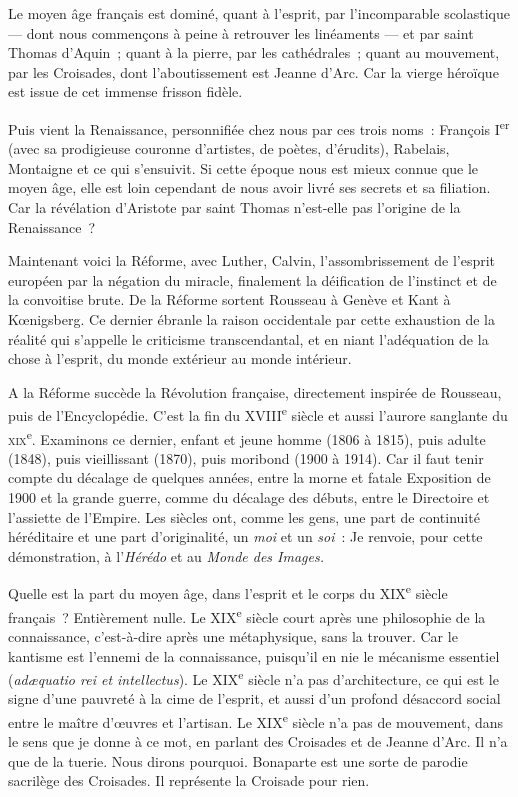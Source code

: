 \documentclass[french,twoside]{book} %
\begin{document}
Le moyen âge français est dominé, quant à l’esprit, par l’incomparable scolastique — dont nous commençons à peine à retrouver les linéaments — et par saint Thomas d’Aquin ; quant à la pierre, par les cathédrales ; quant au mouvement, par les Croisades, dont l’aboutissement est Jeanne d’Arc. Car la vierge héroïque est issue de cet immense frisson fidèle.\par
Puis vient la Renaissance, personnifiée chez nous par ces trois noms : François I\textsuperscript{er} (avec sa prodigieuse couronne d’artistes, de poètes, d’érudits), Rabelais, Montaigne et ce qui s’ensuivit. Si cette époque nous est mieux connue que le moyen âge, elle est loin cependant de nous avoir livré ses secrets et sa filiation. Car la révélation d’Aristote par saint Thomas n’est-elle pas l’origine de la Renaissance ?\par
Maintenant voici la Réforme, avec Luther, Calvin, l’assombrissement de l’esprit européen par la négation du miracle, finalement la déification de l’instinct et de la convoitise brute. De la Réforme sortent Rousseau à Genève et Kant à Kœnigsberg. Ce dernier ébranle la raison occidentale par cette exhaustion de la réalité qui s’appelle le criticisme transcendantal, et en niant l’adéquation de la chose à l’esprit, du monde extérieur au monde intérieur.\par
A la Réforme succède la Révolution française, directement inspirée de Rousseau, puis de l’Encyclopédie. C’est la fin du XVIII\textsuperscript{e} siècle et aussi l’aurore sanglante du \textsc{xix}\textsuperscript{e}. Examinons ce dernier, enfant et jeune homme (1806 à 1815), puis adulte (1848), puis vieillissant (1870), puis moribond (1900 à 1914). Car il faut tenir compte du décalage de quelques années, entre la morne et fatale Exposition de 1900 et la grande guerre, comme du décalage des débuts, entre le Directoire et l’assiette de l’Empire. Les siècles ont, comme les gens, une part de continuité héréditaire et une part d’originalité, un {\itshape moi} et un {\itshape soi} : Je renvoie, pour cette démonstration, à l’{\itshape Hérédo} et au {\itshape Monde des Images.}\par
Quelle est la part du moyen âge, dans l’esprit et le corps du XIX\textsuperscript{e} siècle français ? Entièrement nulle. Le XIX\textsuperscript{e} siècle court après une philosophie de la connaissance, c’est-à-dire après une métaphysique, sans la trouver. Car le kantisme est l’ennemi de la connaissance, puisqu’il en nie le mécanisme essentiel ({\itshape adæquatio rei et intellectus}). Le XIX\textsuperscript{e} siècle n’a pas d’architecture, ce qui est le signe d’une pauvreté à la cime de l’esprit, et aussi d’un profond désaccord social entre le maître d’œuvres et l’artisan. Le XIX\textsuperscript{e} siècle n’a pas de mouvement, dans le sens que je donne à ce mot, en parlant des Croisades et de Jeanne d’Arc. Il n’a que de la tuerie. Nous dirons pourquoi. Bonaparte est une sorte de parodie sacrilège des Croisades. Il représente la Croisade pour rien.\par
\end{document}
